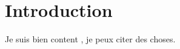 \section*{Introduction}
\label{sec:introduction}

Je suis bien content \cite{pessia_evidence_2012}, je peux citer des choses.